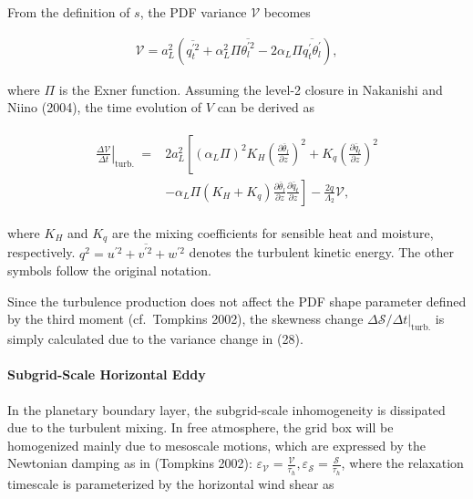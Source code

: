 From the definition of \(s\), the PDF variance \(\mathcal{V}\) becomes

\begin{eqnarray}
\mathcal{V}=a_{L}^{2}\left(\overline{q_{t}^{\prime 2}}+\alpha_{L}^{2} \Pi \overline{\theta_{l}^{\prime 2}}-2 \alpha_{L} \Pi \overline{q_{t}^{\prime} \theta_{l}^{\prime}}\right),
\end{eqnarray}

where \(\Pi\) is the Exner function. Assuming the level-2 closure in
Nakanishi and Niino (2004), the time evolution of \(V\) can be derived
as

\begin{eqnarray}
\begin{aligned}
\left.\frac{\Delta \mathcal{V}}{\Delta t}\right|_{\text {turb. }}=& 2 a_{L}^{2}\left[\left(\alpha_{L} \Pi\right)^{2} K_{H}\left(\frac{\partial \bar{\theta}_{l}}{\partial z}\right)^{2}+K_{q}\left(\frac{\partial \bar{q}_{t}}{\partial z}\right)^{2}\right.\\
&\left.-\alpha_{L} \Pi\left(K_{H}+K_{q}\right) \frac{\partial \bar{\theta}_{l}}{\partial z} \frac{\partial \bar{q}_{t}}{\partial z}\right]-\frac{2 q}{\Lambda_{2}} \mathcal{V},
\end{aligned}
\label{W09-28}
\end{eqnarray}

where \(K_H\) and \(K_q\) are the mixing coefficients for sensible heat
and moisture, respectively.
\(q^{2}=\overline{u^{\prime 2}+v^{\prime 2}+w^{\prime 2}}\) denotes the
turbulent kinetic energy. The other symbols follow the original
notation.

Since the turbulence production does not affect the PDF shape parameter
defined by the third moment (cf.~Tompkins 2002), the skewness change
\(\Delta \mathcal{S} /\left.\Delta t\right|_{\text {turb.}}\) is simply
calculated due to the variance change in (28).

\hypertarget{subgrid-scale-horizontal-eddy}{%
\paragraph{Subgrid-Scale Horizontal
Eddy}\label{subgrid-scale-horizontal-eddy}}

In the planetary boundary layer, the subgrid-scale inhomogeneity is
dissipated due to the turbulent mixing. In free atmosphere, the grid box
will be homogenized mainly due to mesoscale motions, which are expressed
by the Newtonian damping as in (Tompkins 2002):
\(\varepsilon_{\mathcal{V}}=\frac{\mathcal{V}}{\tau_{h}}, \varepsilon_{\mathcal{S}}=\frac{\mathcal{S}}{\tau_{h}}\),
where the relaxation timescale is parameterized by the horizontal wind
shear as

